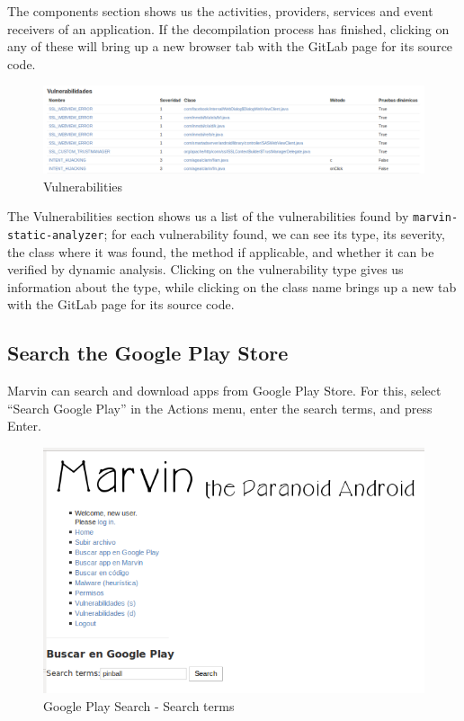 \documentclass[11pt]{article}
\begin{document}
The components section shows us the activities, providers, services and event receivers of an application. If the decompilation process has finished, clicking on any of these will bring up a new browser tab with the GitLab page for its source code. 
 \begin{figure}[H]
\begin{center}
\includegraphics[width=\textwidth]{graphics/marvin_app4.png}
\caption{Vulnerabilities}
\end{center}
\end{figure}

The Vulnerabilities section shows us a list of the vulnerabilities found by \texttt{marvin-static-analyzer}; for each vulnerability found, we can see its type, its severity, the class where it was found, the method if applicable, and whether it can be verified by dynamic analysis. Clicking on the vulnerability type gives us information about the type, while clicking on the class name brings up a new tab with the GitLab page for its source code.

\subsection{Search the Google Play Store}
Marvin can search and download apps from Google Play Store. For this, select ``Search Google Play'' in the Actions menu, enter the search terms, and press Enter.
\begin{figure}[H]
\begin{center}
\includegraphics[width=.6\textwidth]{graphics/marvin_gplay.png}
\caption{Google Play Search - Search terms}
\end{center}
\end{figure}
\end{document}
